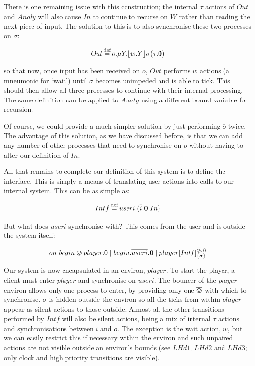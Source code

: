 There is one remaining issue with this construction; the internal
$\tau$ actions of $Out$ and $Analy$ will also cause $In$ to continue
to recurse on $W$ rather than reading the next piece of input.  The
solution to this is to also synchronise these two processes on
$\sigma$:

\begin{equation}
  Out \operatorname{\stackrel{\textrm{def}}{=}} o.\mu Y.\lfloor{w.Y}\rfloor {\sigma} ({\tau.\textbf{0}})
\end{equation}

\noindent so that now, once input has been received on $o$, $Out$
performs $w$ actions (a mneumonic for `wait') until $\sigma$ becomes
unimpeded and is able to tick.  This should then allow all three
processes to continue with their internal processing.  The same
definition can be applied to $Analy$ using a different bound variable
for recursion.

Of course, we could provide a much simpler solution by just performing
$\overline{o}$ twice.  The advantage of this solution, as we have
discussed before, is that we can add any number of other processes
that need to synchronise on $o$ without having to alter our definition
of $In$.

All that remains to complete our definition of this system is to
define the interface.  This is simply a means of translating user
actions into calls to our internal system.  This can be as simple as:

\begin{equation}
  Intf \operatorname{\stackrel{\textrm{def}}{=}} useri.(\overline{i}.\textbf{0} | In)
\end{equation}

But what does $useri$ synchronise with?  This comes from the user and is outside the system itself:

\begin{equation}
   on\ begin \varovee player.0 \;|\; begin.\overline{useri}.\textbf{0} \;|\; {player}[ Intf ]^{\overline{\varovee}.\Omega}_{\{\sigma\}}
\end{equation}

\noindent Our system is now encapsulated in an environ, $player$.  To
start the player, a client must enter $player$ and synchronise on
$useri$.  The bouncer of the $player$ environ allows only one process
to enter, by providing only one $\overline{\varovee}$ with which to synchronise.
$\sigma$ is hidden outside the environ so all the ticks from within
$player$ appear as silent actions to those outside.  Almost all the
other transitions performed by $Intf$ will also be silent actions,
being a mix of internal $\tau$ actions and synchronisations between
$i$ and $o$.  The exception is the wait action, $w$, but we can easily
restrict this if necessary within the environ and such unpaired
actions are not visible outside an environ's bounds (see $LHd1$,
$LHd2$ and $LHd3$; only clock and high priority transitions are
visible).

